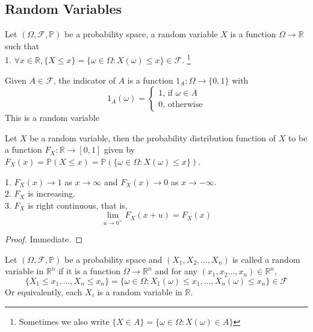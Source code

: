 \subsection{Random Variables}
\begin{definition}
    Let $(\Omega,\mathscr F,\mathbb P)$ be a probability space, a random variable $X$ is a function $\Omega\to\mathbb R$ such that\\
    1. $\forall x\in\mathbb R, \{X\le x\}=\{\omega\in\Omega:X(\omega)\le x\}\in\mathscr F$.
    \footnote{Sometimes we also write $\{X\in A\}=\{\omega\in\Omega:X(\omega)\in A\}$}
\end{definition}
\begin{example}
    Given $A\in\mathscr F$, the indicator of $A$ is a function $1_A:\Omega\to\{0,1\}$ with
    $$1_A(\omega)=\begin{cases}
        1\text{, if $\omega\in A$}\\
        0\text{, otherwise}
    \end{cases}$$
    This is a random variable
\end{example}
\begin{definition}
    Let $X$ be a random variable, then the probability distribution function of $X$ to be a function $F_X:\mathbb R\to [0,1]$ given by $F_X(x)=\mathbb P(X\le x)=\mathbb P(\{\omega\in\Omega:X(\omega)\le x\})$.
\end{definition}
\begin{proposition}
    1. $F_X(x)\to 1$ as $x\to\infty$ and $F_X(x)\to 0$ as $x\to -\infty$.\\
    2. $F_X$ is increasing.\\
    3. $F_X$ is right continuous, that is,
    $$\lim_{u\to 0^+}F_X(x+u)=F_X(x)$$
\end{proposition}
\begin{proof}
    Immediate.
\end{proof}
\begin{definition}
    Let $(\Omega,\mathscr F,\mathbb P)$ be a probability space and $(X_1,X_2,\ldots,X_n)$ is called a random variable in $\mathbb R^n$ if it is a function $\Omega\to\mathbb R^n$ and for any $(x_1,x_2\ldots,x_n)\in\mathbb R^n$,
    $$\{X_1\le x_1,\ldots,X_n\le x_n\}=\{\omega\in\Omega:X_1(\omega)\le x_1,\ldots,X_n(\omega)\le x_n\}\in\mathscr F$$
    Or equivalently, each $X_i$ is a random variable in $\mathbb R$.
\end{definition}
